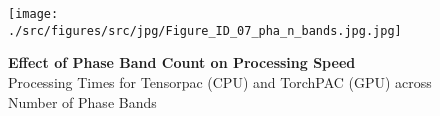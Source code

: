         \clearpage
        \begin{figure}[ht]
        	\centering
            \texttt{[image: ./src/figures/src/jpg/Figure\_ID\_07\_pha\_n\_bands.jpg.jpg]}

\caption{\textbf{
Effect of Phase Band Count on Processing Speed
}
\smallskip
\\
Processing Times for Tensorpac (CPU) and TorchPAC (GPU) across Number of Phase Bands
}
        	\label{fig:07_pha_n_bands}
        \end{figure}
